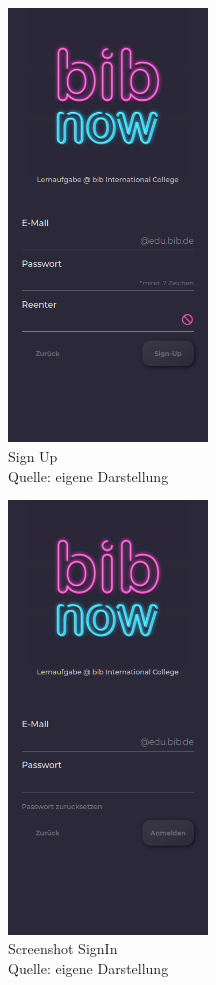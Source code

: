 \documentclass[12pt,titlepage]{article}
\begin{document}
\begin{figure}[hbt!]
\centering
\includegraphics[width=150pt]{screenshots/Screenshot_Mobil2.png}
\caption[Srenshot Sign Up]{Sign Up \\Quelle: eigene Darstellung}
\end{figure}

\begin{figure}[hbt!]
\centering
\includegraphics[width=150pt]{screenshots/Screenshot_Mobil3.png}
\caption[Srenshot Sign In]{Screenshot SignIn \\Quelle: eigene Darstellung}
\end{figure}
\end{document}
